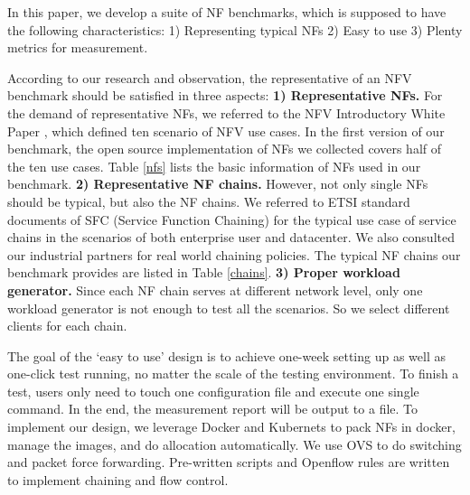 \documentclass{sig-alternate-10pt}
\begin{document}
In this paper, we develop a suite of NF benchmarks, which is supposed to have the following characteristics: 1) Representing typical NFs 2) Easy to use 3) Plenty metrics for measurement.

According to our research and observation, 
the representative of an NFV benchmark 
should be satisfied in three aspects:
\textbf{1) Representative NFs.}
For the demand of representative NFs, 
we referred to the NFV Introductory White Paper \cite{}, 
which defined ten scenario of NFV use cases. 
In the first version of our benchmark, 
the open source implementation of NFs we collected 
covers half of the ten use cases. 
Table \ref{nfs} lists the basic information of NFs used in our benchmark. 
\textbf{2) Representative NF chains.}
However, not only single NFs should be typical, but also the NF chains. 
We referred to ETSI standard documents of SFC 
(Service Function Chaining) \cite{draft-ietf-sfc-dc-use-cases-06} 
for the typical use case of service chains 
in the scenarios of both enterprise user and datacenter.
We also consulted our industrial partners for real world chaining policies. 
The typical NF chains our benchmark provides are listed in Table \ref{chains}. 
\textbf{3) Proper workload generator.}
Since each NF chain serves at different network level, 
only one workload generator is not enough to test all the scenarios. 
So we select different clients for each chain.


The goal of the `easy to use' design is to 
achieve one-week setting up as well as one-click test running, 
no matter the scale of the testing environment. 
To finish a test, users only need to touch one configuration file 
and execute one single command. 
In the end, the measurement report will be output to a file.
To implement our design, 
we leverage Docker and Kubernets to pack NFs in docker, 
manage the images, and do allocation automatically. 
We use OVS to do switching and packet force forwarding.
Pre-written scripts and Openflow rules are written 
to implement chaining and flow control. 
\end{document}

